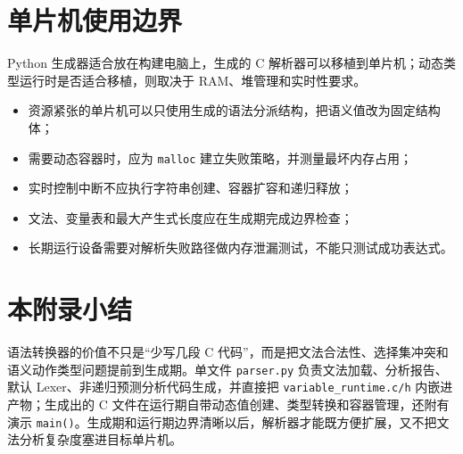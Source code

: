 \section{单片机使用边界}

Python 生成器适合放在构建电脑上，生成的 C 解析器可以移植到单片机；动态类型运行时是否适合移植，则取决于 RAM、堆管理和实时性要求。

\begin{itemize}
\item 资源紧张的单片机可以只使用生成的语法分派结构，把语义值改为固定结构体；
\item 需要动态容器时，应为 \texttt{malloc} 建立失败策略，并测量最坏内存占用；
\item 实时控制中断不应执行字符串创建、容器扩容和递归释放；
\item 文法、变量表和最大产生式长度应在生成期完成边界检查；
\item 长期运行设备需要对解析失败路径做内存泄漏测试，不能只测试成功表达式。
\end{itemize}

\section{本附录小结}

语法转换器的价值不只是“少写几段 C 代码”，而是把文法合法性、选择集冲突和语义动作类型问题提前到生成期。单文件 \texttt{parser.py} 负责文法加载、分析报告、默认 Lexer、非递归预测分析代码生成，并直接把 \texttt{variable\_runtime.c/h} 内嵌进产物；生成出的 C 文件在运行期自带动态值创建、类型转换和容器管理，还附有演示 \texttt{main()}。生成期和运行期边界清晰以后，解析器才能既方便扩展，又不把文法分析复杂度塞进目标单片机。
